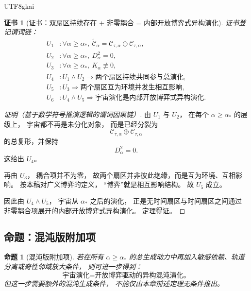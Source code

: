 \documentclass[12pt]{article}
\newtheorem{proposition}{命题}[section]
\newtheorem{Certificate}{证书}[section]
\begin{document}
\begin{CJK*}{UTF8}{gkai}
\begin{Certificate}[证书：双扇区持续存在 + 非零耦合 = 内部开放博弈式异构演化]
\label{cert:tex43-cosmology-evolution}
证书登记谓词链：
\[
\begin{aligned}
  U_1 &: \forall \alpha\ge\alpha_\ast,\
         \widetilde{\mathcal C}_\alpha=
         \mathcal C_{\bar\tau,\alpha}\oplus \mathcal C_{\tau,\alpha},\\
  U_2 &: \forall \alpha\ge\alpha_\ast,\ D_\alpha^2=0,\\
  U_3 &: \forall \alpha\ge\alpha_\ast,\ K_\alpha\not\equiv 0,\\
  U_4 &: U_1\wedge U_2 \Rightarrow \text{两个扇区持续共同参与总演化},\\
  U_5 &: U_3 \Rightarrow \text{两个扇区互为环境并发生相互影响},\\
  U_6 &: U_4\wedge U_5 \Rightarrow
         \text{宇宙演化是内部开放博弈式异构演化}.
\end{aligned}
\]
\end{Certificate}

\begin{proof}[证明（基于数学符号推演逻辑的谓词因果链）]
由 $U_1$ 与 $U_2$，
在每个 $\alpha\ge\alpha_\ast$ 的层级上，
宇宙都不再是未分化对象，
而是已经分裂为
\[
  \mathcal C_{\bar\tau,\alpha}
  \oplus
  \mathcal C_{\tau,\alpha}
\]
的总复形，并保持
\[
  D_\alpha^2=0.
\]
这给出 $U_4$。

再由 $U_3$，
耦合项并不为零，
故两个扇区并非彼此绝缘，而是互为环境、互相影响。
按本稿对广义博弈的定义，
“博弈”就是相互影响结构。
故 $U_5$ 成立。

因此由 $U_4\wedge U_5$，
宇宙从 $\alpha_\ast$ 之后的演化，
正是无时间扇区与时间扇区之间通过非零耦合项展开的内部开放博弈式异构演化。
定理得证。
\end{proof}

\subsection{命题：混沌版附加项}
\label{subsec:tex43-ch9-proposition}

\begin{proposition}[混沌版附加项]
\label{prop:tex43-cosmology-chaos-extension}
若在所有 $\alpha\ge\alpha_\ast$ 的总生成动力中再加入敏感依赖、轨道分离或奇性邻域放大条件，
则可进一步得到：
\[
  \boxed{
    \text{宇宙演化}
    =
    \text{开放博弈驱动的异构混沌演化。}
  }
\]
但这一步需要额外的混沌生成条件，
不能仅由本章前述定理无条件推出。
\end{proposition}


\end{CJK*}
\end{document}
